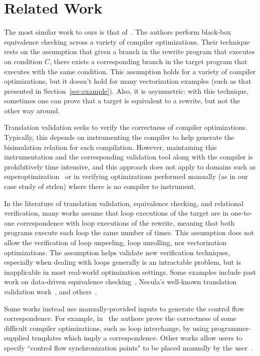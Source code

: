 \section{Related Work}

The most similar work to ours is that of~\cite{Dahiya17ASPLAS}. The
authors perform black-box equivalence checking across a variety of
compiler optimizations. Their technique rests on the assumption that
given a branch in the rewrite program that executes on condition $C$,
there exists a corresponding branch in the target program that executes
with the same condition. This assumption holds for a variety of
compiler optimizations, but it doesn't hold for many vectorization
examples (such as that presented in Section~\ref{sec:example}). Also,
it is asymmetric: with this technique, sometimes one can prove that a
target is equivalent to a rewrite, but not the other way around.

Translation validation seeks to verify
the correctness of compiler optimizations. Typically, this
depends on instrumenting the compiler to help generate
the bisimulation relation for each compilation. However,
maintaining this instrumentation and the corresponding
validation tool along with the compiler is prohibitively time
intensive, and this approach does not apply to domains such as
superoptimization~\cite{Massalin1987,Schkufza2013,Churchill2017} or in
verifying optimizations performed manually (as in our case study of
\libc{} strlen) where there is no compiler to instrument.

In the literature of translation validation, equivalence checking,
and relational verification, many works assume that loop executions
of the target are in one-to-one correspondence with loop executions
of the rewrite, meaning that both programs execute each loop the same
number of times. This assumption does not allow the verification of
loop unpeeling, loop unrolling, nor vectorization optimizations.
The assumption helps validate new verification techniques,
especially when dealing with loops generally is an intractable
problem, but is inapplicable in most real-world optimization
settings. Some examples include past work on data-driven equivalence
checking~\cite{Sharma2013}, Necula's well-known translation validation
work~\cite{Necula2000}, and others~\cite{Fedykovich2015}. 

Some works instead use manually-provided inputs to generate the
control flow correspondence. For example, in~\cite{Kundu2009}
the authors prove the correctness of some difficult compiler
optimizations, such as loop interchange, by using programmer-supplied
templates which imply a correspondence. Other works allow users to
specify ``control flow synchronization points" to be placed manually
by the user~\cite{Kiefer2016}.

